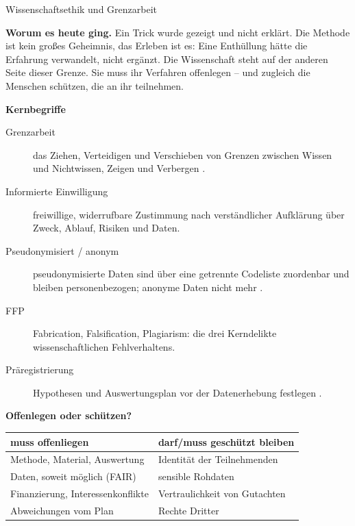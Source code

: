 \begin{handout}{Wissenschaftsethik und Grenzarbeit}

\textbf{Worum es heute ging.} Ein Trick wurde gezeigt und nicht erklärt.
Die Methode ist kein großes Geheimnis, das Erleben ist es: Eine Enthüllung
hätte die Erfahrung verwandelt, nicht ergänzt. Die Wissenschaft steht auf
der anderen Seite dieser Grenze. Sie muss ihr Verfahren offenlegen -- und
zugleich die Menschen schützen, die an ihr teilnehmen.

\textbf{Kernbegriffe}
\begin{description}
  \item[Grenzarbeit] das Ziehen, Verteidigen und Verschieben von Grenzen
    zwischen Wissen und Nichtwissen, Zeigen und Verbergen
    \parencite{gieryn1983boundary}.
  \item[Informierte Einwilligung] freiwillige, widerrufbare Zustimmung
    nach verständlicher Aufklärung über Zweck, Ablauf, Risiken und Daten.
  \item[Pseudonymisiert / anonym] pseudonymisierte Daten sind über eine
    getrennte Codeliste zuordenbar und bleiben personenbezogen; anonyme
    Daten nicht mehr \parencite{dsgvo2016}.
  \item[FFP] Fabrication, Falsification, Plagiarism: die drei Kerndelikte
    wissenschaftlichen Fehlverhaltens.
  \item[Präregistrierung] Hypothesen und Auswertungsplan vor der
    Datenerhebung festlegen \parencite{nosek2018preregistration}.
\end{description}

\textbf{Offenlegen oder schützen?}

\begin{center}\small
\begin{tabular}{p{}p{}}
\toprule
\textbf{muss offenliegen} & \textbf{darf/muss geschützt bleiben} \\
\midrule
Methode, Material, Auswertung & Identität der Teilnehmenden \\
Daten, soweit möglich (FAIR) & sensible Rohdaten \\
Finanzierung, Interessenkonflikte & Vertraulichkeit von Gutachten \\
Abweichungen vom Plan & Rechte Dritter \\
\bottomrule
\end{tabular}
\end{center}


\end{handout}
